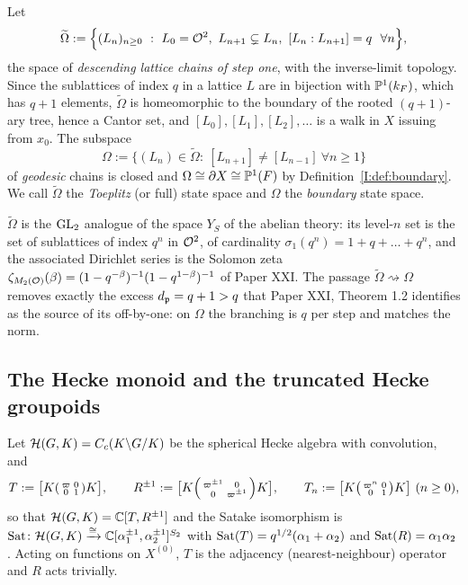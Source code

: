 \begin{definition}\label{I:def:chains}
Let
\[
\widetilde\Omega:=\Bigl\{(L_n)_{n\ge0}\ :\ L_0=\cO^2,\ L_{n+1}\subsetneq L_n,\
[L_n:L_{n+1}]=q\ \ \forall n\Bigr\},
\]
the space of \emph{descending lattice chains of step one}, with the inverse-limit
topology. Since the sublattices of index $q$ in a lattice $L$ are in bijection with
$\mathbb{P}^1(k_F)$, which has $q+1$ elements, $\widetilde\Omega$ is homeomorphic to the
boundary of the rooted $(q+1)$-ary tree, hence a Cantor set, and
$[L_0],[L_1],[L_2],\dots$ is a walk in $X$ issuing from $x_0$. The subspace
\[
\Omega:=\{(L_n)\in\widetilde\Omega:\ [L_{n+1}]\neq[L_{n-1}]\ \forall n\ge1\}
\]
of \emph{geodesic} chains is closed and $\Omega\cong\partial X\cong\mathbb{P}^1(F)$ by
Definition~\ref{I:def:boundary}. We call $\widetilde\Omega$ the \emph{Toeplitz} (or full)
state space and $\Omega$ the \emph{boundary} state space.
\end{definition}

\begin{remark}\label{I:rem:offbyone}
$\widetilde\Omega$ is the $\mathrm{GL}_2$ analogue of the space $Y_S$ of the abelian theory: its
level-$n$ set is the set of sublattices of index $q^n$ in $\mathcal{O}^2$, of cardinality
$\sigma_1(q^n)=1+q+\dots+q^n$, and the associated Dirichlet series is the Solomon zeta
$\zeta_{M_2(\mathcal{O})}(\beta)=(1-q^{-\beta})^{-1}(1-q^{1-\beta})^{-1}$ of Paper XXI. The
passage $\widetilde\Omega\rightsquigarrow\Omega$ removes exactly the excess
$d_{\mathfrak{p}}=q+1>q$ that Paper XXI, Theorem 1.2 identifies as the source of its off-by-one:
on $\Omega$ the branching is $q$ per step and matches the norm.
\end{remark}

\subsection{The Hecke monoid and the truncated Hecke groupoids}

Let $\mathcal{H}(G,K)=C_c(K\backslash G/K)$ be the spherical Hecke algebra with convolution, and
\[
T:=\bigl[K\begin{psmallmatrix}\varpi&0\\0&1\end{psmallmatrix}K\bigr],\qquad
R^{\pm1}:=\bigl[K\begin{psmallmatrix}\varpi^{\pm1}&0\\0&\varpi^{\pm1}\end{psmallmatrix}K\bigr],
\qquad
T_n:=\bigl[K\begin{psmallmatrix}\varpi^{n}&0\\0&1\end{psmallmatrix}K\bigr]\ (n\ge0),
\]
so that $\mathcal{H}(G,K)=\mathbb{C}[T,R^{\pm1}]$ and the Satake isomorphism is
$\operatorname{Sat}\colon\mathcal{H}(G,K)\xrightarrow{\cong}\mathbb{C}[\alpha_1^{\pm1},\alpha_2^{\pm1}]^{S_2}$ with
$\operatorname{Sat}(T)=q^{1/2}(\alpha_1+\alpha_2)$ and $\operatorname{Sat}(R)=\alpha_1\alpha_2$. Acting on functions
on $X^{(0)}$, $T$ is the adjacency (nearest-neighbour) operator and $R$ acts trivially.

